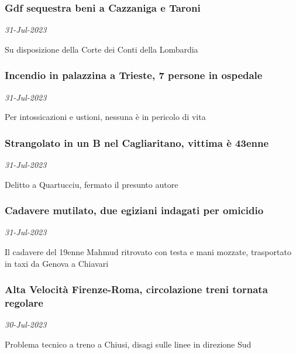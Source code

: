 \subsubsection{Gdf sequestra beni a Cazzaniga e Taroni \href{https://www.ansa.it/sito/notizie/cronaca/2023/07/31/gdf-sequestra-beni-a-cazzaniga-e-taroni_823906af-6d90-402f-b7d6-92d319efeb86.html}{}}
\textit{31-Jul-2023}

Su disposizione della Corte dei Conti della Lombardia
\subsubsection{Incendio in palazzina a Trieste, 7 persone in ospedale \href{https://www.ansa.it/sito/notizie/cronaca/2023/07/31/incendio-in-palazzina-a-trieste-7-persone-in-ospedale_41cae4b0-f53e-4951-994c-b69ba21d6beb.html}{}}
\textit{31-Jul-2023}

Per intossicazioni e ustioni, nessuna \`{e} in pericolo di vita
\subsubsection{Strangolato in un B nel Cagliaritano, vittima \`{e} 43enne \href{https://www.ansa.it/sito/notizie/cronaca/2023/07/31/strangolato-in-un-b-nel-cagliaritano-vittima-e-43enne_089bb101-4567-4e61-b848-55d809478dd8.html}{}}
\textit{31-Jul-2023}

Delitto a Quartucciu, fermato il presunto autore
\subsubsection{Cadavere mutilato, due egiziani indagati per omicidio \href{https://www.ansa.it/sito/notizie/cronaca/2023/07/31/cadavere-mutilato-due-egiziani-indagati-per-omicidio_27230a3a-6734-45e8-8f7a-60f3e3b6bf5f.html}{}}
\textit{31-Jul-2023}

Il cadavere del 19enne Mahmud ritrovato con testa e mani mozzate, trasportato in taxi da Genova a Chiavari
\subsubsection{Alta Velocit\`{a} Firenze-Roma, circolazione treni tornata regolare \href{https://www.ansa.it/sito/notizie/cronaca/2023/07/30/alta-velocita-firenze-roma-circolazione-treni-tornata-regolare-_45a53fc6-7c8e-4912-97e2-8b9865f9b859.html}{}}
\textit{30-Jul-2023}

Problema tecnico a treno a Chiusi, disagi sulle linee in direzione Sud
